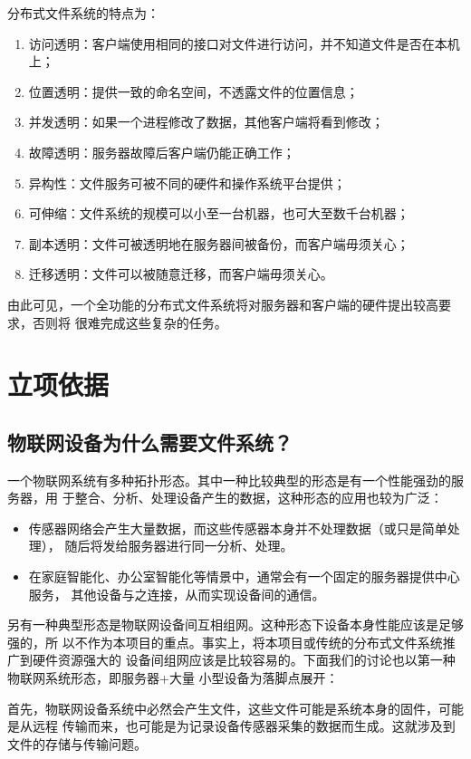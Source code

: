 \documentclass{ctexart}
\begin{document}
分布式文件系统的特点为：
\begin{enumerate}
\item 访问透明：客户端使用相同的接口对文件进行访问，并不知道文件是否在本机上；
\item 位置透明：提供一致的命名空间，不透露文件的位置信息；
\item 并发透明：如果一个进程修改了数据，其他客户端将看到修改；
\item 故障透明：服务器故障后客户端仍能正确工作；
\item 异构性：文件服务可被不同的硬件和操作系统平台提供；
\item 可伸缩：文件系统的规模可以小至一台机器，也可大至数千台机器；
\item 副本透明：文件可被透明地在服务器间被备份，而客户端毋须关心；
\item 迁移透明：文件可以被随意迁移，而客户端毋须关心。
\end{enumerate}

由此可见，一个全功能的分布式文件系统将对服务器和客户端的硬件提出较高要求，否则将
很难完成这些复杂的任务。

\section{立项依据}

\subsection{物联网设备为什么需要文件系统？}

一个物联网系统有多种拓扑形态。其中一种比较典型的形态是有一个性能强劲的服务器，用
于整合、分析、处理设备产生的数据，这种形态的应用也较为广泛：
\begin{itemize}
\item 传感器网络会产生大量数据，而这些传感器本身并不处理数据（或只是简单处理），
  随后将发给服务器进行同一分析、处理。
\item 在家庭智能化、办公室智能化等情景中，通常会有一个固定的服务器提供中心服务，
  其他设备与之连接，从而实现设备间的通信。
\end{itemize}

另有一种典型形态是物联网设备间互相组网。这种形态下设备本身性能应该是足够强的，所
以不作为本项目的重点。事实上，将本项目或传统的分布式文件系统推广到硬件资源强大的
设备间组网应该是比较容易的。下面我们的讨论也以第一种物联网系统形态，即服务器+大量
小型设备为落脚点展开：

首先，物联网设备系统中必然会产生文件，这些文件可能是系统本身的固件，可能是从远程
传输而来，也可能是为记录设备传感器采集的数据而生成。这就涉及到文件的存储与传输问题。
\end{document}
